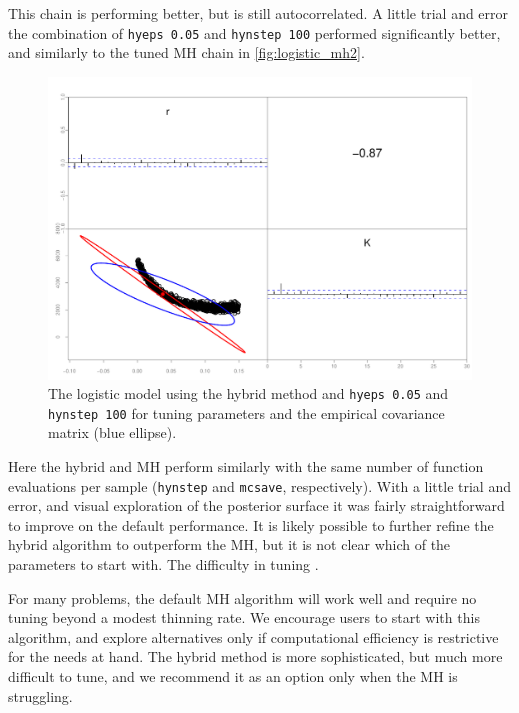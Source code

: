 \documentclass{article}\usepackage[]{graphicx}\usepackage[]{color}
\begin{document}
This chain is performing better, but is still
autocorrelated. A little trial and error the combination of
\texttt{hyeps 0.05} and \texttt{hynstep 100} performed
significantly better, and similarly to the tuned MH chain in
\ref{fig:logistic_mh2}.
\begin{figure}[h]
  \centering
  \includegraphics[width=5in]{../plots/logistic_hy3.pdf}
  \caption{The logistic model using the hybrid method and
    \texttt{hyeps 0.05} and \texttt{hynstep 100} for tuning
    parameters and the empirical covariance matrix (blue
    ellipse).}
  \label{fig:logistic_hy3}
\end{figure}

Here the hybrid and MH perform similarly with the same
number of function evaluations per sample (\texttt{hynstep}
and \texttt{mcsave}, respectively). With a little trial and
error, and visual exploration of the posterior surface it
was fairly straightforward to improve on the default
performance. It is likely possible to further refine the
hybrid algorithm to outperform the MH, but it is not clear
which of the parameters to start with. The difficulty in
tuning  .

For many problems, the default MH algorithm will work well
and require no tuning beyond a modest thinning rate. We
encourage users to start with this algorithm, and explore
alternatives only if computational efficiency is restrictive
for the needs at hand. The hybrid method is more
sophisticated, but much more difficult to tune, and we
recommend it as an option only when the MH is struggling.
\end{document}
